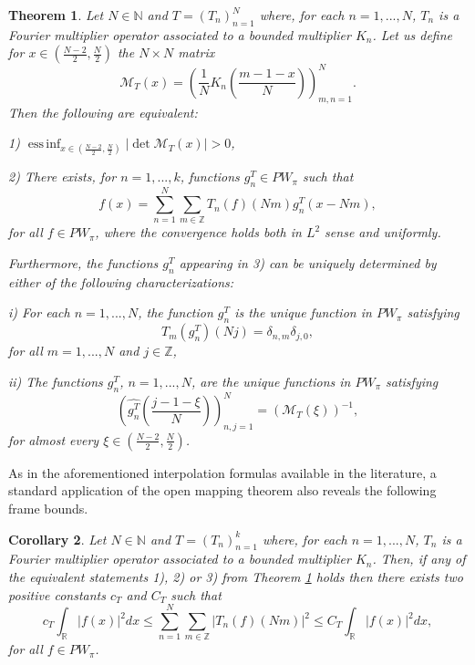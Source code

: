 \documentclass[reqno]{amsart}
\theoremstyle{plain}
\newtheorem{theorem}{Theorem}
\newtheorem{corollary}[theorem]{Corollary}
\theoremstyle{definition}
\numberwithin{equation}{section}
\newcommand{\Z}{{\mathbb Z}}
\newcommand{\R}{{\mathbb R}}
\newcommand{\N}{{\mathbb N}}
\newcommand{\pa}[1]{\left(#1\right)}
\newcommand{\abs}[1]{\left\vert#1\right\vert}
\DeclareMathOperator{\essinf}{ess\,inf}
\providecommand{\abs}[1]{ \lvert#1  \rvert}
\begin{document}
\begin{theorem}\label{theo}
    Let $N\in\N$ and $T=\pa{T_n}_{n=1}^N$ where, for each $n=1,...,N$, $T_n$ is a Fourier multiplier operator associated 
    to a bounded  multiplier $K_n$. Let us define for $x\in\pa{\frac{N-2}{2},\frac{N}{2}}$ the $N \times N$ matrix
	$$\mathcal{M}_T(x)=\pa{\frac{1}{N} K_n\pa{\frac{m-1-x}{N}}}_{m,n=1}^N.$$
	Then the following are equivalent:
	
%	
    1) $\essinf_{x\in \pa{\frac{N-2}{2},\frac{N}{2}}} \abs{\det \mathcal{M}_T(x)}>0$,
	
	2) There exists, for $n=1,...,k$, functions $g^T_n\in PW_\pi$ such that
	$$f(x)=\sum_{n=1}^N \sum_{m\in\Z} T_n(f)(Nm) g^T_n(x-Nm),$$
	for all $f\in PW_\pi$, where the convergence holds both in $L^2$ sense and uniformly.
	
	Furthermore, the functions $g^T_n$ appearing in 3) can be uniquely determined by either of the following 
	characterizations:
	
	i) For each $n=1,...,N$, the function $g^T_n$ is the unique function in $PW_\pi$ satisfying
	$$T_m(g^T_n)(Nj)=\delta_{n,m}\delta_{j,0},$$
	for all $m=1,...,N$ and $j\in\Z$,
	
	ii) The functions $g^T_n$, $n=1,...,N$, are the unique functions in $PW_\pi$ satisfying
	$$\pa{\widehat{g^T_n}\pa{\frac{j-1-\xi}{N}}}_{n,j=1}^N=\pa{\mathcal{M}_T(\xi)}^{-1},$$
	for almost every $\xi\in\pa{\frac{N-2}{2},\frac{N}{2}}$.
\end{theorem}
As in the aforementioned interpolation formulas available in the literature, a standard application of the open mapping theorem also reveals the following frame bounds.
\begin{corollary} \label{cor}
    Let $N\in\N$ and $T=\pa{T_n}_{n=1}^k$ where, for each $n=1,...,N$, $T_n$ is a Fourier multiplier operator associated 
    to a bounded multiplier $K_n$. Then, if any of the equivalent statements 1), 2) or 3) from Theorem \ref{theo} holds 
    then there exists two positive constants $c_T$ and $C_T$ such that
    \begin{equation*}
    c_T \int_\R \abs{f(x)}^2 dx \leq \sum_{n=1}^N \sum_{m\in\Z} \abs{T_n(f)(Nm)}^2
    \leq C_T \int_\R \abs{f(x)}^2 dx,    
    \end{equation*} 
    for all $f\in PW_\pi$.
\end{corollary}
\end{document}
